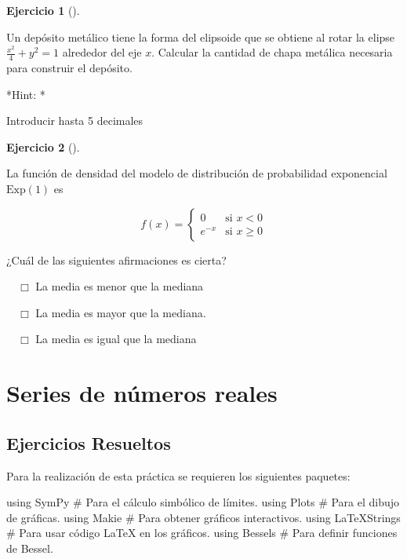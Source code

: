\documentclass[
  a4paper,
]{scrreport}
\newenvironment{Shaded}{\begin{snugshade}}{\end{snugshade}}
\newcommand{\BuiltInTok}[1]{\textcolor[rgb]{0.00,0.23,0.31}{#1}}
\newcommand{\CommentTok}[1]{\textcolor[rgb]{0.37,0.37,0.37}{#1}}
\newcommand{\ImportTok}[1]{\textcolor[rgb]{0.00,0.46,0.62}{#1}}
\theoremstyle{definition}
\newtheorem{exercise}{Ejercicio}[chapter]
\theoremstyle{remark}
\begin{document}
\begin{exercise}[]\protect\hypertarget{exr-integrales-propuesto-7}{}\label{exr-integrales-propuesto-7}

Un depósito metálico tiene la forma del elipsoide que se obtiene al
rotar la elipse \(\frac{x^2}{4}+y^2=1\) alrededor del eje \(x\).
Calcular la cantidad de chapa metálica necesaria para construir el
depósito.

\vspace{18pt}*Hint: *

Introducir hasta 5 decimales

\end{exercise}

\begin{exercise}[]\protect\hypertarget{exr-integrales-propuesto-8}{}\label{exr-integrales-propuesto-8}

La función de densidad del modelo de distribución de probabilidad
exponencial \(\mbox{Exp}(1)\) es

\[
f(x)=
\begin{cases}
0 & \mbox{si $x<0$}\\
e^{-x} & \mbox{si $x\geq 0$}
\end{cases}
\]

¿Cuál de las siguientes afirmaciones es cierta?

${\quad\Box}$ La media es menor que la mediana

${\quad\Box}$ La media es mayor que la mediana.

${\quad\Box}$ La media es igual que la mediana

\end{exercise}


\chapter{Series de números reales}\label{series-de-nuxfameros-reales}

\section{Ejercicios Resueltos}\label{ejercicios-resueltos-5}

Para la realización de esta práctica se requieren los siguientes
paquetes:

\begin{Shaded}
\begin{Highlighting}[]
\ImportTok{using} \BuiltInTok{SymPy}  \CommentTok{\# Para el cálculo simbólico de límites.}
\ImportTok{using} \BuiltInTok{Plots}  \CommentTok{\# Para el dibujo de gráficas.}
\ImportTok{using} \BuiltInTok{Makie} \CommentTok{\# Para obtener gráficos interactivos.}
\ImportTok{using} \BuiltInTok{LaTeXStrings}  \CommentTok{\# Para usar código LaTeX en los gráficos.}
\ImportTok{using} \BuiltInTok{Bessels}  \CommentTok{\# Para definir funciones de Bessel.}
\end{Highlighting}
\end{Shaded}
\end{document}
